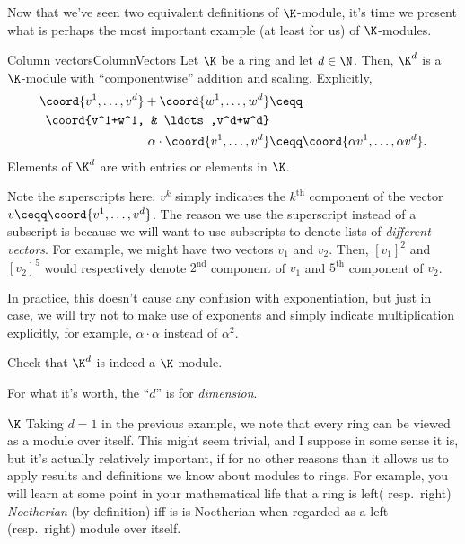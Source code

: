 Now that we've seen two equivalent definitions of $\K$-module, it's time we present what is perhaps the most important example (at least for us) of $\K$-modules.
\begin{exm}{Column vectors}{ColumnVectors}
	Let $\K$ be a ring and let $d\in \N$.  Then, $\K ^d$ is a $\K$-module with ``componentwise'' addition and scaling.  Explicitly,
	\begin{subequations}
		\begin{align}
			\coord{v^1,\ldots ,v^d}+\coord{w^1,\ldots ,w^d} & \ceqq \\
			\coord{v^1+w^1, & \ldots ,v^d+w^d}\notag \\
			\alpha \cdot \coord{v^1,\ldots ,v^d} & \ceqq \coord{\alpha v^1,\ldots ,\alpha v^d}.
		\end{align}
	\end{subequations}
	Elements of $\K ^d$ are  with entries or elements in $\K$.
	\begin{rmk}
		Note the superscripts here.  $v^k$ simply indicates the $k^{\text{th}}$ component of the vector $v\ceqq \coord{v^1,\ldots ,v^d}$.  The reason we use the superscript instead of a subscript is because we will want to use subscripts to denote lists of \emph{different vectors}.  For example, we might have two vectors $v_1$ and $v_2$.  Then, $[v_1]^2$ and $[v_2]^5$ would respectively denote $2^{\text{nd}}$ component of $v_1$ and $5^{\text{th}}$ component of $v_2$.
		
		In practice, this doesn't cause any confusion with exponentiation, but just in case, we will try not to make use of exponents and simply indicate multiplication explicitly, for example, $\alpha \cdot \alpha$ instead of $\alpha ^2$.
	\end{rmk}
	\begin{exr}[breakable=false]{}{}
		Check that $\K ^d$ is indeed a $\K$-module.
	\end{exr}
	\begin{rmk}
		For what it's worth, the ``$d$'' is for \emph{dimension}.
	\end{rmk}
\end{exm}
\begin{exm}{$\K$}{}
	Taking $d=1$ in the previous example, we note that every ring can be viewed as a module over itself.  This might seem trivial, and I suppose in some sense it is, but it's actually relatively important, if for no other reasons than it allows us to apply results and definitions we know about modules to rings.  For example, you will learn at some point in your mathematical life that a ring is left( resp.~right) \emph{Noetherian} (by definition) iff is is Noetherian when regarded as a left (resp.~right) module over itself.
\end{exm}
